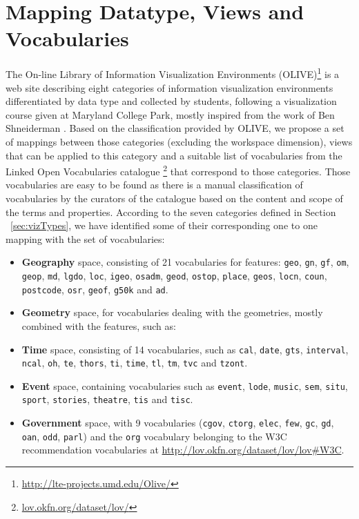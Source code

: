 \section{Mapping Datatype, Views and Vocabularies}
\label{sec:mapping}

The On-line Library of Information Visualization Environments (OLIVE)\footnote{\url{http://lte-projects.umd.edu/Olive/}} is a web site describing eight categories of information visualization environments differentiated by data type and collected by students, following a visualization course given at Maryland College Park, mostly inspired from the work of Ben Shneiderman \cite{Shneiderman99}. Based on the classification provided by OLIVE, we propose a set of mappings between those categories (excluding the workspace dimension), views that can be applied to this category and a suitable list of vocabularies from the Linked Open Vocabularies catalogue \cite{lov11}\footnote{\url{lov.okfn.org/dataset/lov/}} that correspond to those categories. Those vocabularies are easy to be found as there is a manual classification of vocabularies by the curators of the catalogue based on the content and scope of the terms and properties. According to the seven categories defined in Section ~\ref{sec:vizTypes}, we have identified some of their corresponding one to one mapping with the set of vocabularies:
 \begin{itemize}
 \item \textbf{Geography} space, consisting of 21 vocabularies for features: \texttt{geo}, \texttt{gn}, \texttt{gf}, \texttt{om}, \texttt{geop}, \texttt{md}, \texttt{lgdo}, \texttt{loc}, \texttt{igeo}, \texttt{osadm}, \texttt{geod}, \texttt{ostop}, \texttt{place}, \texttt{geos}, \texttt{locn}, \texttt{coun}, \texttt{postcode}, \texttt{osr}, \texttt{geof}, \texttt{g50k} and \texttt{ad}.
 \item \textbf{Geometry} space, for vocabularies dealing with the geometries, mostly combined with the features, such as: 
 \item \textbf{Time} space, consisting of 14 vocabularies, such as \texttt{cal}, \texttt{date}, \texttt{gts}, \texttt{interval}, \texttt{ncal}, \texttt{oh}, \texttt{te}, \texttt{thors}, \texttt{ti}, \texttt{time}, \texttt{tl}, \texttt{tm}, \texttt{tvc} and \texttt{tzont}. 
 \item \textbf{Event} space, containing vocabularies such  as \texttt{event}, \texttt{lode}, \texttt{music}, \texttt{sem}, \texttt{situ}, \texttt{sport}, \texttt{stories}, \texttt{theatre}, \texttt{tis} and \texttt{tisc}.
 \item \textbf{Government} space, with 9 vocabularies (\texttt{cgov}, \texttt{ctorg}, \texttt{elec}, \texttt{few}, \texttt{gc}, \texttt{gd}, \texttt{oan}, \texttt{odd}, \texttt{parl}) and the \texttt{org} vocabulary belonging to the W3C recommendation vocabularies at \url{ http://lov.okfn.org/dataset/lov/lov#W3C}.
 \end{itemize} 
